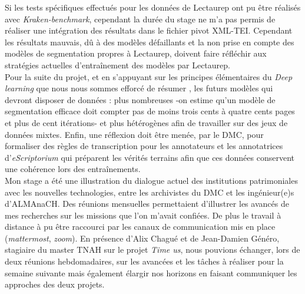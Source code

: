Si les tests spécifiques effectués pour les données de Lectaurep ont pu être réalisés avec \textit{Kraken-benchmark}, cependant la durée du stage ne m'a pas permis de réaliser une intégration des résultats dans le fichier pivot XML-TEI.  Cependant les résultats mauvais, dû à des modèles défaillants et la non prise en compte des modèles de segmentation propres à Lectaurep, doivent faire réfléchir aux stratégies actuelles d'entraînement des modèles par Lectaurep.\\ 

Pour la suite du projet, et en s'appuyant sur les principes élémentaires du \textit{Deep learning} que nous nous sommes efforcé de résumer %
, les futurs modèles qui devront disposer de données : plus nombreuses -on estime qu'un modèle de segmentation efficace doit compter pas de moins trois cents à quatre cents pages et plus de cent itérations- et plus hétérogènes afin de travailler sur des jeux de données mixtes. Enfin, une réflexion doit être menée, par le DMC, pour formaliser des règles de transcription pour les annotateurs et les annotatrices d'\textit{eScriptorium} qui préparent les vérités terrains afin que ces données conservent une cohérence lors des entraînements.\\

Mon stage a été une illustration du dialogue actuel des institutions patrimoniales avec les nouvelles technologies, entre les archivistes du DMC et les ingénieur(e)s d'ALMAnaCH. Des réunions mensuelles permettaient d'illustrer les avancés de mes recherches sur les missions que l'on m'avait confiées. De plus le travail à distance à pu être raccourci par les canaux de communication mis en place (\textit{mattermost}, \textit{zoom}). En présence d'Alix Chagué et de Jean-Damien Généro, stagiaire du master TNAH sur le projet \textit{Time us}, nous pouvions échanger, lors de deux réunions hebdomadaires, sur les avancées et les tâches à réaliser pour la semaine suivante mais également élargir nos horizons en faisant communiquer les approches des deux projets.\\

